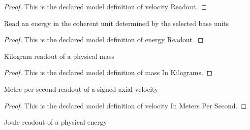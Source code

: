 \begin{proof}
  This is the declared model definition of velocity Readout.
\end{proof}
\begin{definition}
  \label{def:physics:phyx-mini-0551:phyxminiproblems-problemphyxmini0551-energyreadout}
  Read an energy in the coherent unit determined by the selected base units
\end{definition}
\begin{proof}
  This is the declared model definition of energy Readout.
\end{proof}
\begin{definition}
  \label{def:physics:phyx-mini-0551:phyxminiproblems-problemphyxmini0551-massinkilograms}
  Kilogram readout of a physical mass
\end{definition}
\begin{proof}
  This is the declared model definition of mass In Kilograms.
\end{proof}
\begin{definition}
  \label{def:physics:phyx-mini-0551:phyxminiproblems-problemphyxmini0551-velocityinmeterspersecond}
  Metre-per-second readout of a signed axial velocity
\end{definition}
\begin{proof}
  This is the declared model definition of velocity In Meters Per Second.
\end{proof}
\begin{definition}
  \label{def:physics:phyx-mini-0551:phyxminiproblems-problemphyxmini0551-energyinjoules}
  Joule readout of a physical energy
\end{definition}

